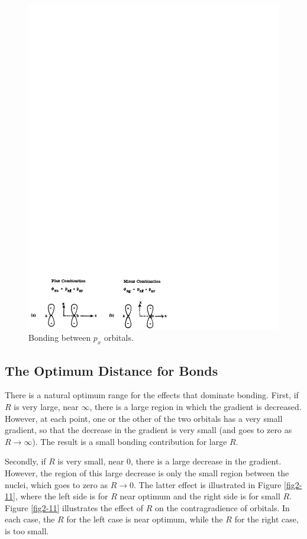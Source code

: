 \begin{figure}
\includegraphics[scale=0.75]{fig2-10}
\caption{Bonding between $p_x$ orbitals.}
\label{fig2-10}
\end{figure}

\subsection{The Optimum Distance for Bonds}

There is a natural optimum range for the effects that dominate 
bonding. First, if $R$ is very large, near $\infty$, there is a large 
region in which the gradient is decreased. However,
at each point, one or the other of the two orbitals has a very small 
gradient, so that the decrease in the gradient is very small (and goes 
to zero as $R \rightarrow \infty$). The result is a small
bonding contribution for large $R$.

Secondly, if $R$ is very small, near 0, there is a large decrease in
the gradient.  However, the region of this large decrease is only the
small region between the nuclei, which goes to zero as $R \rightarrow
0$. The latter effect is illustrated in Figure \ref{fig2-11}, where
the left side is for $R$ near optimum and the right side is for small
$R$. Figure \ref{fig2-11} illustrates the effect of $R$ on the
contragradience of orbitals.  In each case, the $R$ for the left case
is near optimum, while the $R$ for the right case, is too small.

